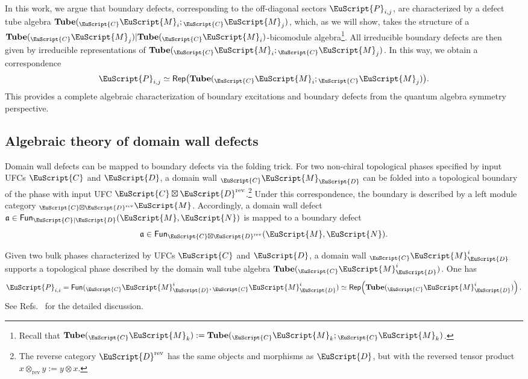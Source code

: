 \documentclass[a4paper,11pt]{article}
\theoremstyle{definition}
\theoremstyle{remark}
\newcommand\eC           {\EuScript{C}}
\newcommand\eD           {\EuScript{D}}
\newcommand\eM          {\EuScript{M}}
\newcommand\eN         {\EuScript{N}}
\newcommand\eP         {\EuScript{P}}
\newcommand{\Rep}{\mathsf{Rep}}
\newcommand{\Fun}{\mathsf{Fun}}
\begin{document}
In this work, we argue that boundary defects, corresponding to the off-diagonal sectors $\eP_{i,j}$, are characterized by a defect tube algebra $\mathbf{Tube}({_{\eC}\eM_i};{_{\eC}\eM_j})$, which, as we will show, takes the structure of a $\mathbf{Tube}({_{\eC}\eM_j})|\mathbf{Tube}({_{\eC}\eM_i})$-bicomodule algebra\footnote{Recall that  $\mathbf{Tube}({_{\eC}\eM_k}) := \mathbf{Tube}({_{\eC}\eM_k};{_{\eC}\eM_k})$.}.
All irreducible boundary defects are then given by irreducible representations of $\mathbf{Tube}({_{\eC}\eM_i};{_{\eC}\eM_j})$.
In this way, we obtain a correspondence
\begin{equation}
    \eP_{i,j} \simeq \Rep\bigl(\mathbf{Tube}({_{\eC}\eM_i};{_{\eC}\eM_j})\bigr).
\end{equation}
This provides a complete algebraic characterization of boundary excitations and boundary defects from the quantum algebra symmetry perspective.






\subsection{Algebraic theory of domain wall defects}

Domain wall defects can be mapped to boundary defects via the folding trick.
For two non-chiral topological phases specified by input UFCs $\eC$ and $\eD$, 
a domain wall ${}_{\eC}\eM_{\eD}$ can be folded into a topological boundary 
of the phase with input UFC $\eC \boxtimes \eD^{\rm rev}$.\footnote{The reverse category \(\eD^{\mathrm{rev}}\) has the same objects and morphisms as \(\eD\), but with the reversed tensor product \(x\otimes_{\mathrm{rev}}y:=y\otimes x\).} 
Under this correspondence, the boundary is described by a left module category 
${}_{\eC \boxtimes \eD^{\rm rev}}\eM$.
Accordingly, a domain wall defect 
$\mathfrak{a} \in \Fun_{\eC|\eD}(\eM,\eN)$ 
is mapped to a boundary defect
\begin{equation}
    \mathfrak{a} \in \Fun_{\eC \boxtimes \eD^{\rm rev}}(\eM,\eN).
\end{equation}

Given two bulk phases characterized by UFCs $\eC$ and $\eD$, 
a domain wall ${}_{\eC}\eM^i_{\eD}$ supports a topological phase 
described by the domain wall tube algebra 
$\mathbf{Tube}({}_{\eC}\eM^i_{\eD})$. 
One has
\begin{equation}
  \eP_{i,i} 
  = \mathsf{Fun}({}_{\eC}\eM^i_{\eD},{}_{\eC}\eM^i_{\eD})
  \simeq 
  \Rep\!\left(\mathbf{Tube}({}_{\eC}\eM^i_{\eD})\right).
\end{equation}
See Refs.~\cite{jia2024weakTube,jia2025tube,bai2025weakhopf} for the detailed discussion.
\end{document}
